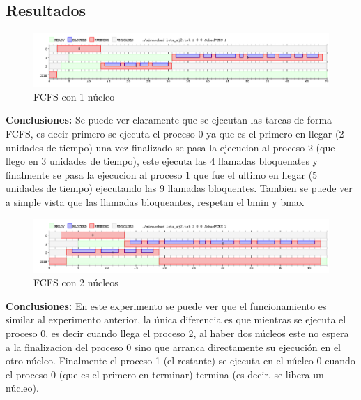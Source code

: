 \subsection{Resultados}

\begin{figure}[H]
\begin{center}
\includegraphics[width=1.1\textwidth]{img/ej2_1.png}
     \caption{FCFS con 1 núcleo}
\end{center}
\end{figure}

\textbf{Conclusiones:} Se puede ver claramente que se ejecutan las tareas de forma FCFS, es decir primero se ejecuta el proceso 0 ya que es el primero en llegar (2 unidades de tiempo) una vez finalizado se pasa la ejecucion al proceso 2 (que llego en 3 unidades de tiempo), este ejecuta las 4 llamadas bloquenates y finalmente se pasa la ejecucion al proceso 1 que fue el ultimo en llegar (5 unidades de tiempo) ejecutando las 9 llamadas bloquentes. Tambien se puede ver a simple vista que las llamadas bloqueantes, respetan el bmin y bmax


\begin{figure}[H]
\begin{center}
\includegraphics[width=1.1\textwidth]{img/ej2_2.png}
     \caption{FCFS con 2 núcleos}
\end{center}
\end{figure}

\textbf{Conclusiones:} En este experimento se puede ver que el funcionamiento es similar al experimento anterior, la única diferencia es que mientras se ejecuta el proceso 0, es decir cuando llega el proceso 2, al haber dos núcleos este no espera a la finalizacion del proceso 0 sino que arranca directamente su ejecución en el otro núcleo. Finalmente el proceso 1 (el restante) se ejecuta en el núcleo 0 cuando el proceso 0 (que es el primero en terminar) termina (es decir, se libera un núcleo).


